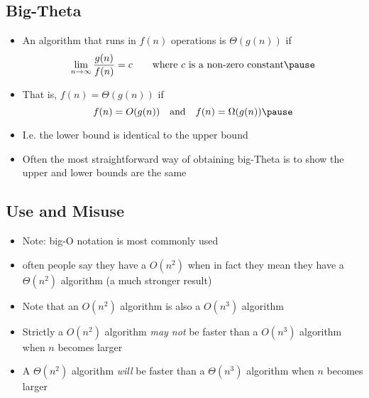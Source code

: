 \begin{slide}
\section{Big-Theta}

\begin{PauseHighLight}
  \begin{itemize}
  \item An algorithm that runs in $f(n)$ operations is $\Theta(g(n))$ if
    \begin{displaymath}
      \lim_{n\rightarrow\infty} \frac{g(n)}{f(n)} = c \qquad
      \mbox{where $c$ is a non-zero constant}\pause
    \end{displaymath}
  \item That is, $f(n)=\Theta(g(n))$ if
    \begin{displaymath}
      f(n) = O(g(n)) \quad \mbox{and} \quad f(n) = \Omega(g(n))\pause
    \end{displaymath}
  \item I.e. the lower bound is identical to the upper bound\pause
  \item Often the most straightforward way of obtaining big-Theta is to
    show the upper and lower bounds are the same\pause
  \end{itemize}
\end{PauseHighLight}

\end{slide}


\begin{slide}
\section[-1]{Use and Misuse}

\begin{PauseHighLight}
  \begin{itemize}
  \item Note: big-O notation is most commonly used\pause
  \item often people say they have a $O(n^2)$ when in fact they mean
    they have a $\Theta(n^2)$ algorithm (a much stronger result)\pause
  \item Note that an $O(n^2)$ algorithm is also a $O(n^3)$ algorithm\pause
  \item Strictly a $O(n^2)$ algorithm \emph{may not} be faster than a
    $O(n^3)$ algorithm when $n$ becomes larger\pause
  \item A $\Theta(n^2)$ algorithm \emph{will} be faster than a $\Theta(n^3)$
    algorithm when $n$ becomes larger\pause
  \end{itemize}
\end{PauseHighLight}

\end{slide}

